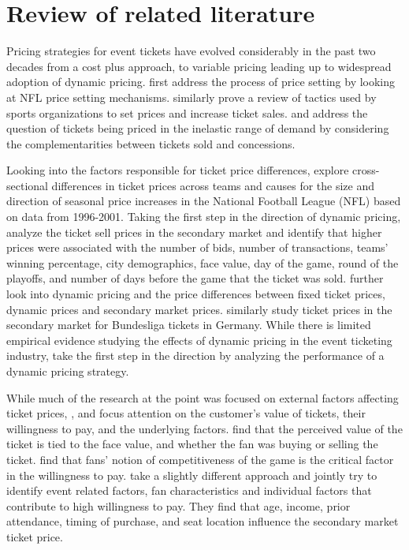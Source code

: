 \documentclass[letterpaper, 12pt]{article}
\begin{document}
\section{Review of related literature}
Pricing strategies for event tickets have evolved considerably in the past two decades from a cost plus approach, to variable pricing leading up to widespread adoption of dynamic pricing. \cite{reese2001exploratory} first address the process of price setting by looking at NFL price setting mechanisms. \cite{howard2004tactics} similarly prove a review of tactics used by sports organizations to set prices and increase ticket sales. \cite{krautmann2007can} and \cite{coates2007ticket} address the question of tickets being priced in the inelastic range of demand by considering the complementarities between tickets sold and concessions. 

Looking into the factors responsible for ticket price differences, \cite{rishe2003ticket} explore cross-sectional differences in ticket prices across teams and causes for the size and direction of seasonal price increases in the National Football League (NFL) based on data from 1996-2001. Taking the first step in the direction of dynamic pricing, \cite{drayer2009value} analyze the ticket sell prices in the secondary market and identify that higher prices were associated with the number of bids, number of transactions, teams' winning percentage, city demographics, face value, day of the game, round of the playoffs, and number of days before the game that the ticket was sold. \cite{shapiro2012new} further look into dynamic pricing and the price differences between fixed ticket prices, dynamic prices and secondary market prices. \cite{kemper2015factors} similarly study ticket prices in the secondary market for Bundesliga tickets in Germany. While there is limited empirical evidence studying the effects of dynamic pricing in the event ticketing industry, \cite{xu2017designing} take the first step in the direction by analyzing the performance of a dynamic pricing strategy. 

While much of the research at the point was focused on external factors affecting ticket prices, \cite{drayer2011examination}, \cite{nalbantis2017fans} and \cite{popp2018factors} focus attention on the customer's value of tickets, their willingness to pay, and the underlying factors.  \cite{drayer2011examination} find that the perceived value of the ticket is tied to the face value, and whether the fan was buying or selling the ticket. \cite{nalbantis2017fans} find that fans' notion of competitiveness of the game is the critical factor in the willingness to pay. \cite{popp2018factors} take a slightly different approach and jointly try to identify event related factors, fan characteristics and individual factors that contribute to high willingness to pay. They find that age, income, prior attendance, timing of purchase, and seat location influence the secondary market ticket price.
\end{document}
